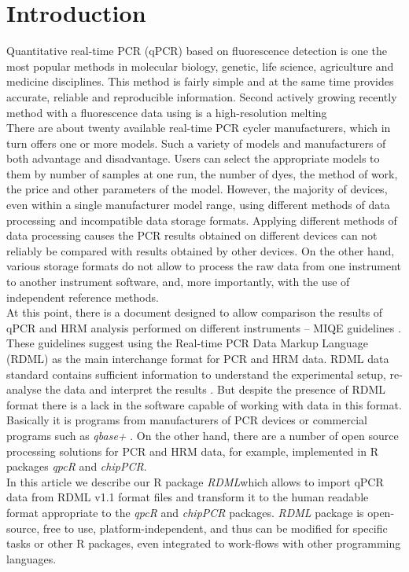 \documentclass{bioinfo}
\begin{document}
\section{Introduction}

Quantitative real-time PCR (qPCR) based on fluorescence detection is one the most popular methods in molecular biology, genetic, life science, agriculture and medicine disciplines. This method is fairly simple and at the same time provides accurate, reliable and reproducible information\cite{kubista_real-time_2006}. Second actively growing recently method with a fluorescence data using is a high-resolution melting \cite{reed_high-resolution_2007}\cite{wittwer_high-resolution_2009}\\
There are about twenty available real-time PCR cycler manufacturers, which in turn offers one or more models. Such a variety of models and manufacturers of both advantage and disadvantage. Users can select the appropriate models to them by number of samples at one run, the number of dyes, the method of work, the price and other parameters of the model. However, the majority of devices, even within a single manufacturer model range, using different methods of data processing and incompatible data storage formats. Applying different methods of data processing causes the PCR results obtained on different devices can not reliably be compared with results obtained by other devices. On the other hand, various storage formats do not allow to process the raw data from one instrument to another instrument software, and, more importantly, with the use of independent reference methods.\\
At this point, there is a document designed to allow comparison the results of qPCR and HRM analysis performed on different instruments -- MIQE guidelines \cite{bustin_miqe_2009}. These guidelines suggest using the Real-time PCR Data Markup Language (RDML) as the main interchange format for PCR and HRM data. RDML data standard contains sufficient information to understand the experimental setup, re-analyse the data and interpret the results \cite{lefever_rdml:_2009}. But despite the presence of RDML format there is a lack in the software capable of working with data in this format. Basically it is programs from manufacturers of PCR devices or commercial programs such as \textit{qbase+} \cite{_rdml_????}. On the other hand, there are a number of open source processing solutions for PCR and HRM data, for example, implemented in R packages \textit{qpcR}\cite{ritz_qpcr:_2008} and \textit{chipPCR}.\\
In this article we describe our R package \textit{RDML}which allows to import qPCR data from RDML v1.1 format files and transform it to the human readable format appropriate to the \textit{qpcR} and \textit{chipPCR} packages. \textit{RDML} package is open-source, free to use, platform-independent, and thus can be modified for specific tasks or other R packages, even integrated to work-flows with other programming languages.
\end{document}
